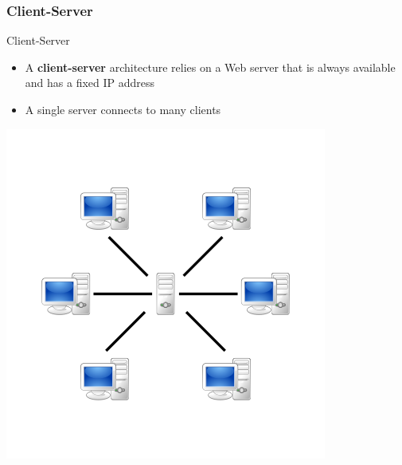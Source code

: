 \documentclass{beamer}
\begin{document}
        \subsubsection{Client-Server}
        \begin{frame}{Client-Server}
            \begin{itemize}
                \item A \textbf{client-server} architecture relies on a Web server that is always available and has a fixed IP address\\
                \item A single server connects to many clients
            \end{itemize}
            \centering
            \includegraphics[scale=0.5]{Server-based-network.png}
        \end{frame}
\end{document}
